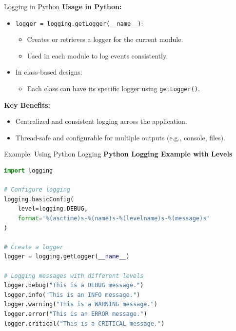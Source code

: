 \documentclass[10pt]{beamer}
\let\olditem\item
\renewcommand\item{\olditem\justifying}
\begin{document}
	\begin{frame}{Logging in Python}
		\textbf{Usage in Python:}
		\begin{itemize}
			\item \texttt{logger = logging.getLogger(\_\_name\_\_)}:
			\begin{itemize}
				\item Creates or retrieves a logger for the current module.
				\item Used in each module to log events consistently.
			\end{itemize}
			\item In class-based designs:
			\begin{itemize}
				\item Each class can have its specific logger using \texttt{getLogger()}.
			\end{itemize}
		\end{itemize}
		
		\textbf{Key Benefits:}
		\begin{itemize}
			\item Centralized and consistent logging across the application.
			\item Thread-safe and configurable for multiple outputs (e.g., console, files).
		\end{itemize}
	\end{frame}
	
	
	\begin{frame}[fragile]{Example: Using Python Logging}
		\textbf{Python Logging Example with Levels}
		\begin{lstlisting}[language=Python, caption=Basic Logging Example]
import logging

# Configure logging
logging.basicConfig(
	level=logging.DEBUG,
	format='%(asctime)s-%(name)s-%(levelname)s-%(message)s'
)

# Create a logger
logger = logging.getLogger(__name__)

# Logging messages with different levels
logger.debug("This is a DEBUG message.")
logger.info("This is an INFO message.")
logger.warning("This is a WARNING message.")
logger.error("This is an ERROR message.")
logger.critical("This is a CRITICAL message.")
		\end{lstlisting}
	\end{frame}
	
	
	
\end{document}
